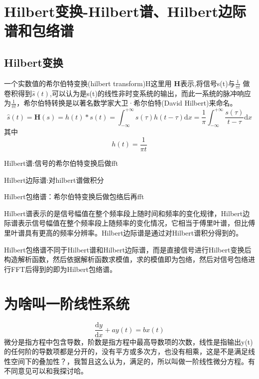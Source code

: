 \documentclass{article}
\begin{document}
	
	\section{Hilbert变换-Hilbert谱、Hilbert边际谱和包络谱}
	\subsection{Hilbert变换}
	一个实数值的希尔伯特变换(hilbert transform)H这里用 $\boldsymbol{H}$表示,将信号s(t)与$\frac{1}{\pi t}$	做卷积得到$\hat s(t)$,可以认为是s(t)的线性非时变系统的输出，而此一系统的脉冲响应为$\frac{1}{\pi t}$，希尔伯特转换是以著名数学家大卫·希尔伯特(David Hilbert)来命名。
	\begin{equation}
		\hat s(t)=\boldsymbol{H}(s)=h(t)*s(t)=\int_{-\infty}^{+\infty} {s(\tau)h(t-\tau)\mathrm{d}x}=\frac{1}{\pi}\int_{-\infty}^{+\infty}{\frac{s(\tau)}{t-\tau}\mathrm{d}x}
	\end{equation}
	其中
	\begin{equation}
		h(t)=\frac{1}{\pi t}
	\end{equation}
	
	Hilbert谱:信号的希尔伯特变换后做fft
	
	Hilbert边际谱:对hilbert谱做积分
	
	Hilbert包络谱：希尔伯特变换后做包络后再fft
	
	Hilbert谱表示的是信号幅值在整个频率段上随时间和频率的变化规律，Hilbert边际谱表示信号幅值在整个频率段上随频率的变化情况，它相当于傅里叶谱，但比傅里叶谱具有更高的频率分辨率。Hilbert边际谱是通过对Hilbert谱积分得到的。
	
	Hilbert包络谱不同于Hilbert谱和Hilbert边际谱，而是直接信号进行Hilbert变换后构造解析函数，然后依据解析函数求模值，求的模值即为包络，然后对信号包络进行FFT后得到的即为Hilbert包络谱。
	
	\section{为啥叫一阶线性系统}
	\begin{equation}
		\frac{\mathrm{d}y}{\mathrm{d}x}+ay(t)=bx(t)
	\end{equation}
	微分是指方程中包含导数，阶数是指方程中最高导数项的次数，线性是指输出y(t)的任何阶的导数项都是分开的，没有平方或多次方，也没有相乘，这是不是满足线性空间下的叠加性？，我暂且这么认为，满足的，所以叫做一阶线性微分方程。有不同意见可以和我探讨哈。
\end{document}
